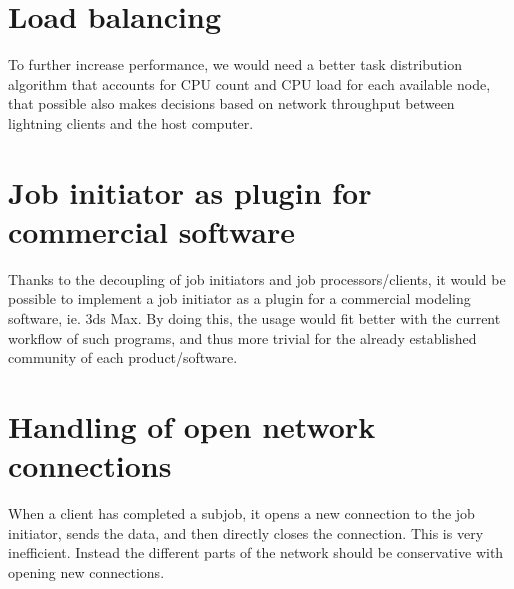 \section{Load balancing}
To further increase performance, we would need a better task distribution algorithm that accounts for CPU count and CPU load for each available node, that possible also makes decisions based on network throughput between lightning clients and the host computer.

\section{Job initiator as plugin for commercial software}
Thanks to the decoupling of job initiators and job processors/clients, it would be possible to implement a job initiator as a plugin for a commercial modeling software, ie. 3ds Max. By doing this, the usage would fit better with the current workflow of such programs, and thus more trivial for the already established community of each product/software.

\section{Handling of open network connections}
When a client has completed a subjob, it opens a new connection to the job initiator, sends the data, and then directly closes the connection.
This is very inefficient. Instead the different parts of the network should be conservative with opening new connections.

